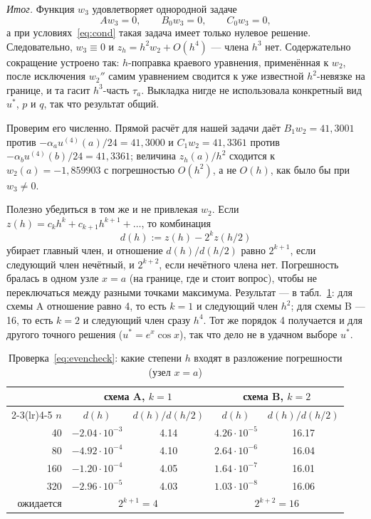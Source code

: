 \documentclass[12pt,a4paper]{article}
\begin{document}
\emph{Итог.} Функция $w_3$ удовлетворяет однородной задаче
\[
A w_3=0,\qquad B_0w_3=0,\qquad C_0w_3=0,
\]
а при условиях~\eqref{eq:cond} такая задача имеет только нулевое решение.
Следовательно, $w_3\equiv0$ и $z_h=h^2w_2+O(h^4)$ --- члена $h^3$ нет.
Содержательно сокращение устроено так: $h$-поправка краевого уравнения,
применённая к $w_2$, после исключения $w_2''$ самим уравнением сводится
к уже известной $h^2$-невязке на границе, и та гасит $h^3$-часть
$\tau_a$. Выкладка нигде не использовала конкретный вид $u^*$, $p$ и $q$,
так что результат общий.

Проверим его численно. Прямой расчёт для нашей задачи даёт
$B_1w_2=41{,}3001$ против $-\alpha_au^{(4)}(a)/24=41{,}3000$ и
$C_1w_2=41{,}3361$ против $-\alpha_bu^{(4)}(b)/24=41{,}3361$; величина
$z_h(a)/h^2$ сходится к $w_2(a)=-1{,}859903$ с погрешностью $O(h^2)$, а
не $O(h)$, как было бы при $w_3\neq0$.

Полезно убедиться в том же и не привлекая $w_2$. Если
$z(h)=c_kh^k+c_{k+1}h^{k+1}+\dots$, то комбинация
\begin{equation}\label{eq:evencheck}
d(h):=z(h)-2^{k}z(h/2)
\end{equation}
убирает главный член, и отношение $d(h)/d(h/2)$ равно $2^{k+1}$, если
следующий член нечётный, и $2^{k+2}$, если нечётного члена нет.
Погрешность бралась в одном узле $x=a$ (на границе, где и стоит вопрос),
чтобы не переключаться между разными точками максимума. Результат --- в
табл.~\ref{tab:even}: для схемы A отношение равно 4, то есть
$k=1$ и следующий член $h^2$; для схемы B --- 16, то есть $k=2$ и
следующий член сразу $h^4$. Тот же порядок 4 получается и для другого
точного решения ($u^*=e^{x}\cos x$), так что дело не в удачном выборе
$u^*$.

\begin{table}[htbp]
\caption{Проверка~\eqref{eq:evencheck}: какие степени $h$ входят в
разложение погрешности (узел $x=a$)}
\label{tab:even}
\centering
\begin{tabular}{r c c c c}
\toprule
& \multicolumn{2}{c}{схема A, $k=1$} & \multicolumn{2}{c}{схема B, $k=2$}\\
\cmidrule(lr){2-3}\cmidrule(lr){4-5}
$n$ & $d(h)$ & $d(h)/d(h/2)$ & $d(h)$ & $d(h)/d(h/2)$\\
\midrule
40 & $-2.04\cdot10^{-3}$ & 4.14 & $4.26\cdot10^{-5}$ & 16.17 \\
80 & $-4.92\cdot10^{-4}$ & 4.10 & $2.64\cdot10^{-6}$ & 16.04 \\
160 & $-1.20\cdot10^{-4}$ & 4.05 & $1.64\cdot10^{-7}$ & 16.01 \\
320 & $-2.96\cdot10^{-5}$ & 4.03 & $1.03\cdot10^{-8}$ & 16.06 \\
\midrule
\multicolumn{1}{r}{ожидается} & \multicolumn{2}{c}{$2^{k+1}=4$}
 & \multicolumn{2}{c}{$2^{k+2}=16$}\\
\bottomrule
\end{tabular}
\end{table}
\end{document}
